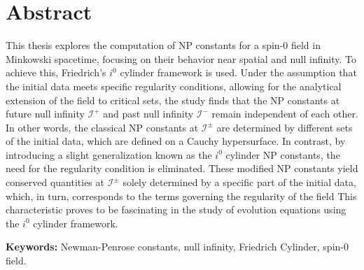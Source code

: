 
\section*{Abstract}


This thesis explores the computation of NP constants for a spin-0 field in Minkowski spacetime, focusing on their behavior near spatial and null infinity. To achieve this, Friedrich's $i^0$ cylinder framework is used. Under the assumption that the initial data meets specific regularity conditions, allowing for the analytical extension of the field to critical sets, the study finds that the NP constants at future null infinity $\mathscr{I}^{+}$ and past null infinity $\mathscr{I}^{-}$ remain independent of each other. In other words, the classical NP constants at $\mathscr{I}^{\pm}$ are determined by different sets of the initial data, which are defined on a Cauchy hypersurface.
In contrast, by introducing a slight generalization known as the $i^0$ cylinder NP constants, the need for the regularity condition is eliminated. These modified NP constants yield conserved quantities at $\mathscr{I}^{\pm}$ solely determined by a specific part of the initial data, which, in turn, corresponds to the terms governing the regularity of the field This characteristic proves to be fascinating in the study of evolution equations using the $i^0$ cylinder framework.

\vfill

\textbf{\Large Keywords:} Newman-Penrose constants, null infinity, Friedrich Cylinder, spin-0 field.

